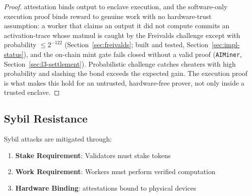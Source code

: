 \begin{proof}
\TEE{} attestation binds output to enclave execution, and the software-only execution proof
binds reward to genuine work with no hardware-trust assumption: a worker that claims an
output it did not compute commits an activation-trace whose matmul is caught by the
Freivalds challenge except with probability $\le 2^{-122}$ (Section~\ref{sec:freivalds};
built and tested, Section~\ref{sec:impl-status}), and the on-chain mint gate fails closed
without a valid proof (\texttt{AIMiner}, Section~\ref{sec:l3-settlement}). Probabilistic
challenge catches cheaters with high probability and slashing the bond exceeds the expected
gain. The execution proof is what makes this hold for an untrusted, hardware-free prover,
not only inside a trusted enclave.
\end{proof}

\subsection{Sybil Resistance}

Sybil attacks are mitigated through:
\begin{enumerate}
    \item \textbf{Stake Requirement}: Validators must stake tokens
    \item \textbf{Work Requirement}: Workers must perform verified computation
    \item \textbf{Hardware Binding}: \TEE{} attestations bound to physical devices
\end{enumerate}

